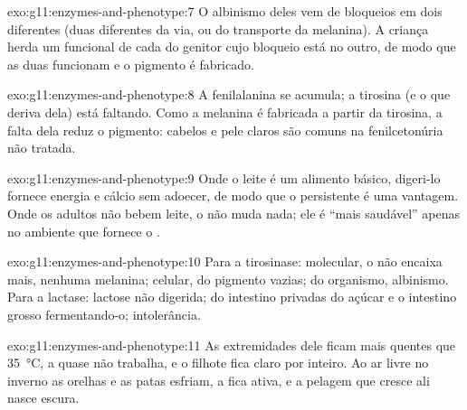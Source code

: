 \begin{solution}{exo:g11:enzymes-and-phenotype:7}
O albinismo deles vem de bloqueios em dois  diferentes (duas
 diferentes da via, ou do transporte da melanina). A criança
herda um  funcional de cada  do genitor cujo bloqueio está no
outro, de modo que as duas  funcionam e o pigmento é fabricado.
\end{solution}

\begin{solution}{exo:g11:enzymes-and-phenotype:8}
A fenilalanina se acumula; a tirosina (e o que deriva dela) está
faltando. Como a melanina é fabricada a partir da tirosina, a falta
dela reduz o pigmento: cabelos e pele claros são comuns na
fenilcetonúria não tratada.
\end{solution}

\begin{solution}{exo:g11:enzymes-and-phenotype:9}
Onde o leite é um alimento básico, digeri-lo fornece energia e cálcio
sem adoecer, de modo que o  persistente é uma vantagem. Onde os
adultos não bebem leite, o  não muda nada; ele é ``mais saudável''
apenas no ambiente que fornece o .
\end{solution}

\begin{solution}{exo:g11:enzymes-and-phenotype:10}
Para a tirosinase: molecular, o  não encaixa mais, nenhuma
melanina; celular,  do pigmento vazias; do organismo, albinismo.
Para a lactase: lactose não digerida;  do intestino privadas do
açúcar e o intestino grosso fermentando-o; intolerância.
\end{solution}

\begin{solution}{exo:g11:enzymes-and-phenotype:11}
As extremidades dele ficam mais quentes que \qty{35}{\celsius}, a
 quase não trabalha, e o filhote fica claro por inteiro. Ao ar
livre no inverno as orelhas e as patas esfriam, a  fica ativa, e
a pelagem que cresce ali nasce escura.
\end{solution}

